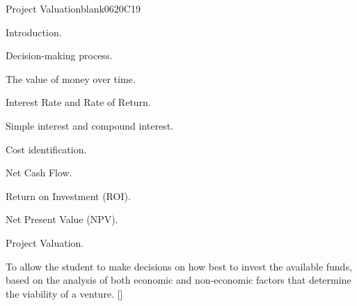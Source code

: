 \begin{syllabus}
\begin{unit}{}{Project Valuation}{blank06}{20}{C19}
\begin{topics}
      \item Introduction.
       \item Decision-making process.
       \item The value of money over time.
       \item Interest Rate and Rate of Return.
       \item Simple interest and compound interest.
       \item Cost identification.
       \item Net Cash Flow.
       \item Return on Investment (ROI).
      \item Net Present Value (NPV).
       \item Project Valuation.
   \end{topics}
   \begin{learningoutcomes}
      \item To allow the student to make decisions on how best to invest the available funds, based on the analysis of both economic and non-economic factors that determine the viability of a venture. [\Assessment]
   \end{learningoutcomes}
\end{unit}


\end{syllabus}
